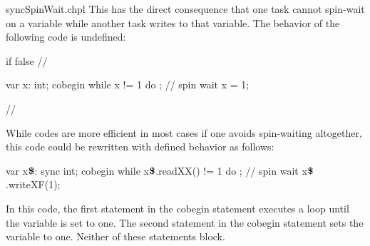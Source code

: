\begin{chapelexample}{syncSpinWait.chpl}
This has the direct consequence that one task cannot spin-wait on a
variable while another task writes to that variable.  The behavior of
the following code is undefined:
\begin{chapelpre}
if false { // }
\end{chapelpre}
\begin{chapel}
var x: int;
cobegin {
  while x != 1 do ;  // spin wait
  x = 1;
}
\end{chapel}
\begin{chapelnoprint}
// {
}
\end{chapelnoprint}
While codes are more efficient in most cases if one avoids
spin-waiting altogether, this code could be rewritten with defined
behavior as follows:
\begin{chapel}
var x$\mbox{{\bf \$}}$: sync int;
cobegin {
  while x$\mbox{{\bf \$}}$.readXX() != 1 do ;  // spin wait
  x$\mbox{{\bf \$}}$.writeXF(1);
}
\end{chapel}
\begin{chapeloutput}
\end{chapeloutput}
In this code, the first statement in the cobegin statement executes a
loop until the variable is set to one.  The second statement in the
cobegin statement sets the variable to one.  Neither of these
statements block.
\end{chapelexample}
